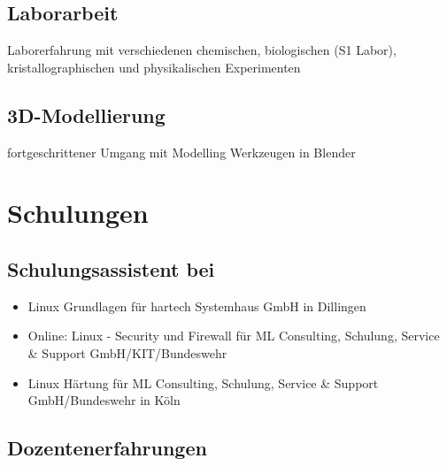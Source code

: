 \documentclass{article}
\begin{document}
\subsection{Laborarbeit}
Laborerfahrung mit verschiedenen chemischen, biologischen (S1 Labor), kristallographischen und physikalischen Experimenten

\subsection{3D-Modellierung}
fortgeschrittener Umgang mit Modelling Werkzeugen in Blender

\newpage

\section{Schulungen}

\subsection{Schulungsassistent bei}

\begin{itemize}
\item Linux Grundlagen für hartech Systemhaus GmbH in Dillingen
\item Online: Linux - Security und Firewall für ML Consulting, Schulung, Service \& Support GmbH/KIT/Bundeswehr
\item Linux Härtung für ML Consulting, Schulung, Service \& Support GmbH/Bundeswehr in Köln
\end{itemize}

\subsection{Dozentenerfahrungen}
\end{document}
